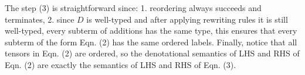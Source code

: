 The step (3) is straightforward since: 1. reordering always succeeds and terminates, 2. since $D$ is well-typed and after applying rewriting rules it is still well-typed, every subterm of additions has the same type, this ensures that every subterm of the form Eqn. (2) has the same ordered labels.
Finally, notice that all tensors in Eqn. (2) are ordered, so the denotational semantics of LHS and RHS of Eqn. (2) are exactly the semantics of LHS and RHS of Eqn. (3).



